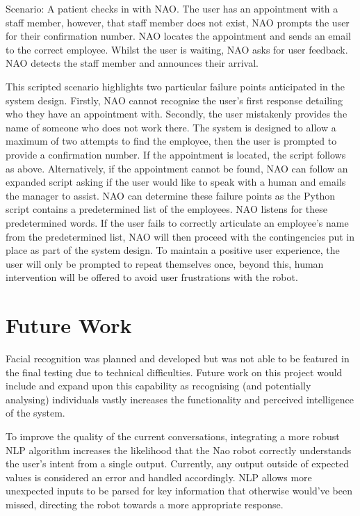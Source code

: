 \documentclass[conference]{IEEEtran}
\begin{document}
Scenario: A patient checks in with NAO. The user has an appointment with a staff member, however, that staff member does not exist, NAO prompts the user for their confirmation number. NAO locates the appointment and sends an email to the correct employee. Whilst the user is waiting, NAO asks for user feedback. NAO detects the staff member and announces their arrival.

This scripted scenario highlights two particular failure points anticipated in the system design. Firstly, NAO cannot recognise the user’s first response detailing who they have an appointment with. Secondly, the user mistakenly provides the name of someone who does not work there.  The system is designed to allow a maximum of two attempts to find the employee, then the user is prompted to provide a confirmation number. If the appointment is located, the script follows as above. Alternatively, if the appointment cannot be found, NAO can follow an expanded script asking if the user would like to speak with a human and emails the manager to assist. NAO can determine these failure points as the Python script contains a predetermined list of the employees. NAO listens for these predetermined words. If the user fails to correctly articulate an employee’s name from the predetermined list, NAO will then proceed with the contingencies put in place as part of the system design. To maintain a positive user experience, the user will only be prompted to repeat themselves once, beyond this, human intervention will be offered to avoid user frustrations with the robot. 


\section{Future Work}Facial recognition was planned and developed but was not able to be featured in the final testing due to 
technical difficulties. Future work on this project would include and expand upon this capability as recognising (and potentially 
analysing) individuals vastly increases the functionality and perceived intelligence of the system.

To improve the quality of the current conversations, integrating a more robust NLP algorithm increases the likelihood that the Nao 
robot correctly understands the user’s intent from a single output. Currently, any output outside of expected values is considered 
an error and handled accordingly. NLP allows more unexpected inputs to be parsed for key information that otherwise would’ve been 
missed, directing the robot towards a more appropriate response.
\end{document}
